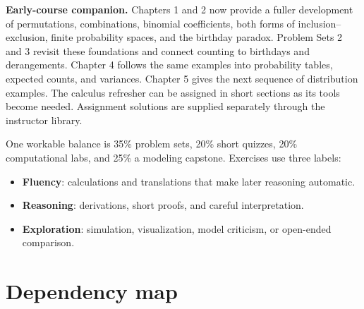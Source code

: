 \textbf{Early-course companion.} Chapters 1 and 2 now provide a fuller
development of permutations, combinations, binomial coefficients, both forms
of inclusion--exclusion, finite probability spaces, and the birthday paradox.
Problem Sets 2 and 3 revisit these foundations and connect counting to
birthdays and derangements. Chapter 4 follows the same examples into
probability tables, expected counts, and variances. Chapter 5 gives the
next sequence of distribution examples. The calculus refresher can be
assigned in short sections as its tools become needed. Assignment solutions are
supplied separately through the instructor library.

One workable balance is 35\% problem sets, 20\% short quizzes, 20\% computational labs, and 25\% a modeling capstone. Exercises use three labels:
\begin{itemize}
  \item \textbf{Fluency}: calculations and translations that make later reasoning automatic.
  \item \textbf{Reasoning}: derivations, short proofs, and careful interpretation.
  \item \textbf{Exploration}: simulation, visualization, model criticism, or open-ended comparison.
\end{itemize}

\section*{Dependency map}

\begin{center}
\end{center}

